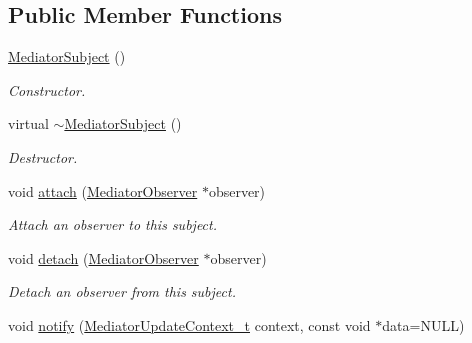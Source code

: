 \subsection*{Public Member Functions}
\begin{DoxyCompactItemize}
\item 
\hypertarget{classMediatorSubject_a3db4b61f18f2a98025de4ab896855c27}{
\hyperlink{classMediatorSubject_a3db4b61f18f2a98025de4ab896855c27}{MediatorSubject} ()}
\label{classMediatorSubject_a3db4b61f18f2a98025de4ab896855c27}

\begin{DoxyCompactList}\small\item\em Constructor. \item\end{DoxyCompactList}\item 
\hypertarget{classMediatorSubject_a63e7e01e35bd1d073861c14a3734439b}{
virtual \hyperlink{classMediatorSubject_a63e7e01e35bd1d073861c14a3734439b}{$\sim$MediatorSubject} ()}
\label{classMediatorSubject_a63e7e01e35bd1d073861c14a3734439b}

\begin{DoxyCompactList}\small\item\em Destructor. \item\end{DoxyCompactList}\item 
\hypertarget{classMediatorSubject_aa4837dc018798cde2a754992e48e3ca0}{
void \hyperlink{classMediatorSubject_aa4837dc018798cde2a754992e48e3ca0}{attach} (\hyperlink{classMediatorObserver}{MediatorObserver} $\ast$observer)}
\label{classMediatorSubject_aa4837dc018798cde2a754992e48e3ca0}

\begin{DoxyCompactList}\small\item\em Attach an observer to this subject. \item\end{DoxyCompactList}\item 
\hypertarget{classMediatorSubject_aa3e6f03e597b315593f8ec7b654b1c23}{
void \hyperlink{classMediatorSubject_aa3e6f03e597b315593f8ec7b654b1c23}{detach} (\hyperlink{classMediatorObserver}{MediatorObserver} $\ast$observer)}
\label{classMediatorSubject_aa3e6f03e597b315593f8ec7b654b1c23}

\begin{DoxyCompactList}\small\item\em Detach an observer from this subject. \item\end{DoxyCompactList}\item 
\hypertarget{classMediatorSubject_a3bb9ea404e6bd3f3f7153cca88377049}{
void \hyperlink{classMediatorSubject_a3bb9ea404e6bd3f3f7153cca88377049}{notify} (\hyperlink{namespaceMediatorUpdateContext_aa3a9bed543f2a2237dc2b6feea170a1d}{MediatorUpdateContext\_\-t} context, const void $\ast$data=NULL)}
\label{classMediatorSubject_a3bb9ea404e6bd3f3f7153cca88377049}


\end{DoxyCompactItemize}
